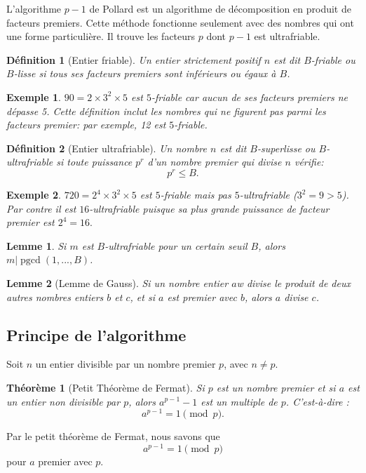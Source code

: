 \documentclass[french, 12pt, titlepage]{article}
\DeclareMathOperator{\pgcd}{pgcd}
\newtheorem{definition}{D{\'e}finition}
\newtheorem{theoreme}{Th{\'e}or{\`e}me}
\newtheorem{lemme}{Lemme}
\newtheorem{example}{Exemple}
\begin{document}
L'algorithme $p-1$ de Pollard est un algorithme de décomposition en produit de facteurs premiers. Cette méthode fonctionne seulement avec des nombres qui ont une forme particulière. Il trouve les facteurs $p$ dont $p-1$ est ultrafriable.

\begin{definition}[Entier friable]
Un entier strictement positif $n$ est dit $B$-friable ou $B$-lisse si tous ses facteurs premiers sont inférieurs ou égaux à $B$. 
\end{definition}
\begin{example}
$90 = 2 \times 3^2 \times 5$ est $5$-friable car aucun de ses facteurs premiers ne dépasse 5.
Cette définition inclut les nombres qui ne figurent pas parmi les facteurs premier: par exemple, 12 est $5$-friable.
\end{example}
\begin{definition}[Entier ultrafriable]
Un nombre $n$ est dit $B$-superlisse ou $B$-ultrafriable si toute puissance $p^r$ d'un nombre premier qui divise $n$ vérifie: \[ p^r \leq B .\]
\end{definition}
\begin{example}
$720 = 2^4 \times 3^2 \times 5$ est $5$-friable mais pas $5$-ultrafriable ($3^2 = 9 > 5$). Par contre il est $16$-ultrafriable puisque sa plus grande puissance de facteur premier est $2^4 = 16.$
\end{example}

\begin{lemme}\label{leme}
Si $m$ est $B$-ultrafriable pour un certain seuil $B$, alors $m | \pgcd(1,...,B)$.
\end{lemme}

\begin{lemme}[Lemme de Gauss]
Si un nombre entier $a$w divise le produit de deux autres nombres entiers $b$ et $c$, et si $a$ est premier avec $b$, alors $a$ divise $c$.
\end{lemme}

\subsection{Principe de l'algorithme}

Soit $n$ un entier divisible par un nombre premier $p$, avec $n \neq p$. 

\begin{theoreme}[Petit Théorème de Fermat]
Si $p$ est un nombre premier et si $a$ est un entier non divisible par $p$, alors $a^{p-1} - 1$ est un multiple de $p$. C'est-à-dire : \[a^{p-1} = 1 \pmod p .\]
\end{theoreme}
Par le petit théorème de Fermat, nous savons que \[a^{p-1} = 1 \pmod p \] pour $a$ premier avec $p$. 
\end{document}
